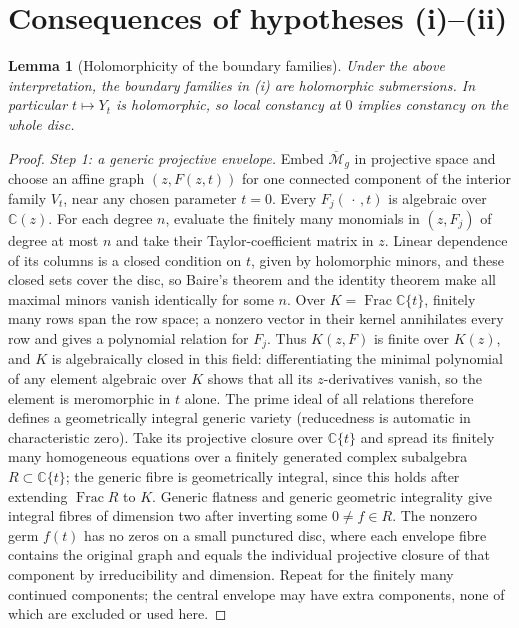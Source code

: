 \documentclass[11pt]{article}
\newcommand{\M}{\mathcal M}
\newcommand{\cl}[1]{\overline{#1}}
\newtheorem{lemma}[theorem]{Lemma}
\theoremstyle{remark}
\begin{document}
\section{Consequences of hypotheses (i)--(ii)}\label{sec:hyp}

\begin{lemma}[Holomorphicity of the boundary families]\label{lem:regularity}
Under the above interpretation, the boundary families in (i)
are holomorphic submersions. In particular \(t\mapsto Y_t\)
is holomorphic, so local constancy at \(0\) implies constancy
on the whole disc.
\end{lemma}
\begin{proof}
\emph{Step 1: a generic projective envelope.}
Embed \(\cl{\M}_g\) in projective space and choose an affine graph
\((z,F(z,t))\) for one connected component of the interior
family \(V_t\), near any chosen parameter \(t=0\).
Every \(F_j(\,\cdot\,,t)\) is algebraic over \(\mathbb C(z)\).
For each degree \(n\), evaluate the finitely many monomials
in \((z,F_j)\) of degree at most \(n\) and take their
Taylor-coefficient matrix in \(z\).
Linear dependence of its columns is a closed condition on
\(t\), given by holomorphic minors, and these closed sets cover
the disc, so Baire's theorem and the identity theorem make all
maximal minors vanish identically for some \(n\).
Over \(K=\operatorname{Frac}\mathbb C\{t\}\), finitely many
rows span the row space; a nonzero vector in their kernel
annihilates every row and gives a polynomial relation for \(F_j\).
Thus \(K(z,F)\) is finite over \(K(z)\), and
\(K\) is algebraically closed in this field:
differentiating the minimal polynomial of any element
algebraic over \(K\) shows that all its \(z\)-derivatives
vanish, so the element is meromorphic in \(t\) alone.
The prime ideal of all relations therefore defines a
geometrically integral generic variety \cite[Tag 037P]{Stacks}
(reducedness is automatic in characteristic zero). Take its
projective closure over \(\mathbb C\{t\}\) and spread its finitely
many homogeneous equations over a finitely generated complex
subalgebra \(R\subset\mathbb C\{t\}\); the generic fibre
is geometrically integral, since this holds after extending
\(\operatorname{Frac}R\) to \(K\). Generic flatness and
generic geometric integrality
\cite[Tags 052A, 0559, 0578]{Stacks} give integral fibres
of dimension two after inverting some \(0\ne f\in R\).
The nonzero germ \(f(t)\) has no zeros on a small punctured disc,
where each envelope fibre contains the original graph and equals
the individual projective closure of that component by
irreducibility and dimension. Repeat for the finitely many continued components;
the central envelope may have extra components, none of which are
excluded or used here.


\end{proof}
\end{document}
